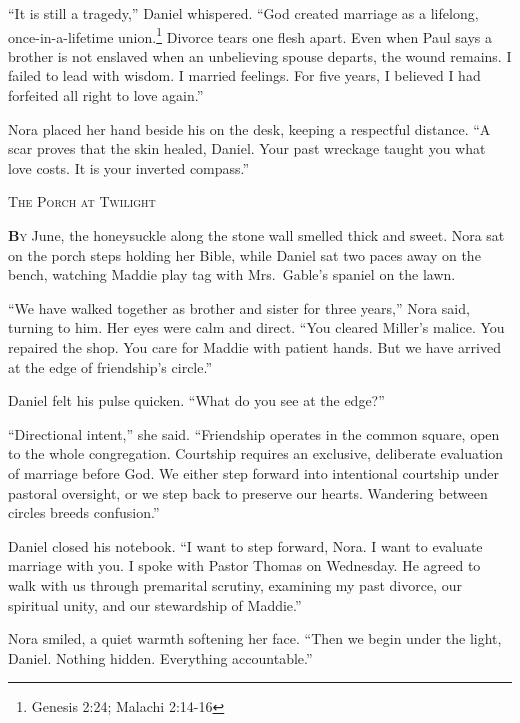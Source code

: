 \documentclass[11pt]{article}
\begin{document}
``It is still a tragedy,'' Daniel whispered. ``God created marriage as a lifelong, once-in-a-lifetime union.\footnote{Genesis 2:24; Malachi 2:14-16} Divorce tears one flesh apart. Even when Paul says a brother is not enslaved when an unbelieving spouse departs, the wound remains. I failed to lead with wisdom. I married feelings. For five years, I believed I had forfeited all right to love again.''

Nora placed her hand beside his on the desk, keeping a respectful distance. ``A scar proves that the skin healed, Daniel. Your past wreckage taught you what love costs. It is your inverted compass.''

\newpage

\begin{center}
    {\scshape\large The Porch at Twilight}\par
    \vspace{0.2in}
\end{center}

\lettrine[lines=3,findent=3pt,nindent=0pt]{\textbf{B}}{y} June, the honeysuckle along the stone wall smelled thick and sweet. Nora sat on the porch steps holding her Bible, while Daniel sat two paces away on the bench, watching Maddie play tag with Mrs.~Gable's spaniel on the lawn.

``We have walked together as brother and sister for three years,'' Nora said, turning to him. Her eyes were calm and direct. ``You cleared Miller's malice. You repaired the shop. You care for Maddie with patient hands. But we have arrived at the edge of friendship's circle.''

Daniel felt his pulse quicken. ``What do you see at the edge?''

``Directional intent,'' she said. ``Friendship operates in the common square, open to the whole congregation. Courtship requires an exclusive, deliberate evaluation of marriage before God. We either step forward into intentional courtship under pastoral oversight, or we step back to preserve our hearts. Wandering between circles breeds confusion.''

Daniel closed his notebook. ``I want to step forward, Nora. I want to evaluate marriage with you. I spoke with Pastor Thomas on Wednesday. He agreed to walk with us through premarital scrutiny, examining my past divorce, our spiritual unity, and our stewardship of Maddie.''

Nora smiled, a quiet warmth softening her face. ``Then we begin under the light, Daniel. Nothing hidden. Everything accountable.''
\end{document}
